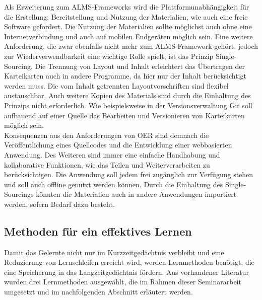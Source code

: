 \noindent Als Erweiterung zum ALMS-Frameworks wird die Plattformunabhängigkeit für die Erstellung, Bereitstellung und Nutzung der Materialien, wie auch eine freie Software gefordert. Die Nutzung der Materialien sollte möglichst auch ohne eine Internetverbindung und auch auf mobilen Endgeräten möglich sein. 
Eine weitere Anforderung, die zwar ebenfalls nicht mehr zum ALMS-Framework gehört, jedoch zur Wiederverwendbarkeit eine wichtige Rolle spielt, ist das Prinzip \glqq Single-Sourcing\grqq{}. Die Trennung von Layout und Inhalt erleichtert das Übertragen der Karteikarten auch in andere Programme, da hier nur der Inhalt berücksichtigt werden muss. Die vom Inhalt getrennten Layoutvorschriften sind flexibel austauschbar. Auch weitere Kopien des Materials sind durch die Einhaltung des Prinzips nicht erforderlich. Wie beispielsweise in der Versionsverwaltung Git soll aufbauend auf einer Quelle das Bearbeiten und Versionieren von Karteikarten möglich sein. \\


\noindent Konsequenzen aus den Anforderungen von OER sind demnach die Veröffentlichung eines Quellcodes und die Entwicklung einer webbasierten Anwendung. Des Weiteren sind immer eine einfache Handhabung und kollaborative Funktionen, wie das Teilen und Weiterverarbeiten zu berücksichtigen. Die Anwendung soll jedem frei zugänglich zur Verfügung stehen und soll auch offline genutzt werden können. Durch die Einhaltung des Single-Sourcings könnten die Materialien auch in andere Anwendungen importiert werden, sofern Bedarf dazu besteht.


\subsection{Methoden für ein effektives Lernen}
Damit das Gelernte nicht nur im Kurzzeitgedächtnis verbleibt und eine Reduzierung von Lernschleifen erreicht wird, werden Lernmethoden benötigt, die eine Speicherung in das Langzeitgedächtnis fördern. Aus vorhandener Literatur wurden drei Lernmethoden ausgewählt, die im Rahmen dieser Seminararbeit umgesetzt und im nachfolgenden Abschnitt erläutert werden.

